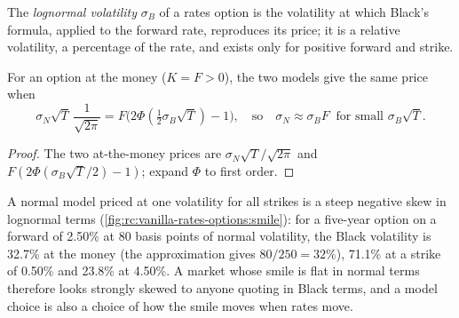 \begin{definition}\label{def:rc:vanilla-rates-options:lognormal}
The \emph{lognormal volatility} $\sigma_B$ of a
rates option is the volatility at which Black's formula, applied to the
forward rate, reproduces its price; it is a relative volatility, a percentage
of the rate, and exists only for positive forward and strike.
\end{definition}

\begin{proposition}\label{prop:rc:vanilla-rates-options:atm}
For an option at the money ($K=F>0$), the two models give the same price when
\[
\sigma_N\sqrt{T}\,\frac{1}{\sqrt{2\pi}} = F\bigl(2\Phi(\tfrac12\sigma_B\sqrt T)-1\bigr),
\quad\text{so}\quad
\sigma_N \approx \sigma_B F \ \text{ for small }\sigma_B\sqrt T.
\]
\end{proposition}
\begin{proof}
The two at-the-money prices are $\sigma_N\sqrt{T}/\sqrt{2\pi}$ and
$F(2\Phi(\sigma_B\sqrt T/2)-1)$; expand $\Phi$ to first order.
\end{proof}

A normal model priced at one volatility for all strikes is a steep negative
skew in lognormal terms (\cref{fig:rc:vanilla-rates-options:smile}): for a
five-year option on a forward of 2.50\% at 80 basis points of normal
volatility, the Black volatility is 32.7\% at the money (the approximation
gives $80/250 = 32\%$), 71.1\% at a strike of 0.50\% and 23.8\% at 4.50\%. A
market whose smile is flat in normal terms therefore looks strongly skewed to
anyone quoting in Black terms, and a model choice is also a choice of how the
smile moves when rates move.

\begin{omfigure}

\label{fig:rc:vanilla-rates-options:smile}
\end{omfigure}

